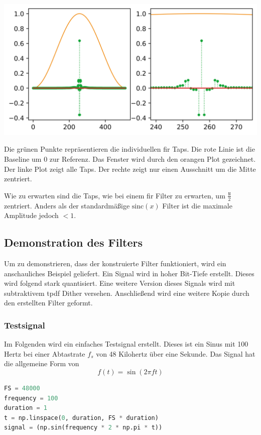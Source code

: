 \includegraphics{./img/ce1bcfcc09df6843eca007d841c83f231c4e8479.png}

Die grünen Punkte repräsentieren die individuellen \gls{fir} Taps. Die
rote Linie ist die Baseline um 0 zur Referenz. Das Fenster wird durch
den orangen Plot gezeichnet. Der linke Plot zeigt alle Taps. Der rechte
zeigt nur einen Ausschnitt um die Mitte zentriert.

Wie zu erwarten sind die Taps, wie bei einem \gls{fir} Filter zu
erwarten, um \(\frac{\texttt{N}}{2}\) zentriert. Anders als der
standardmäßige \(\text{sinc} (x)\) Filter ist die maximale Amplitude
jedoch \(<1\).

\hypertarget{demonstration-des-filters}{%
\subsection{Demonstration des Filters}\label{demonstration-des-filters}}

Um zu demonstrieren, dass der konstruierte Filter funktioniert, wird ein
anschauliches Beispiel geliefert. Ein Signal wird in hoher Bit-Tiefe
erstellt. Dieses wird folgend stark quantisiert. Eine weitere Version
dieses Signals wird mit subtraktivem \gls{tpdf} Dither versehen.
Anschließend wird eine weitere Kopie durch den erstellten Filter
geformt.

\hypertarget{testsignal}{%
\subsubsection{Testsignal}\label{testsignal}}

Im Folgenden wird ein einfaches Testsignal erstellt. Dieses ist ein
Sinus mit 100 Hertz bei einer Abtastrate \(f_s\) von 48 Kilohertz über
eine Sekunde. Das Signal hat die allgemeine Form von
\[f(t) = \sin (2 \pi f t)\]

\begin{lstlisting}[language=Python]
FS = 48000
frequency = 100
duration = 1
t = np.linspace(0, duration, FS * duration)
signal = (np.sin(frequency * 2 * np.pi * t))
\end{lstlisting}

